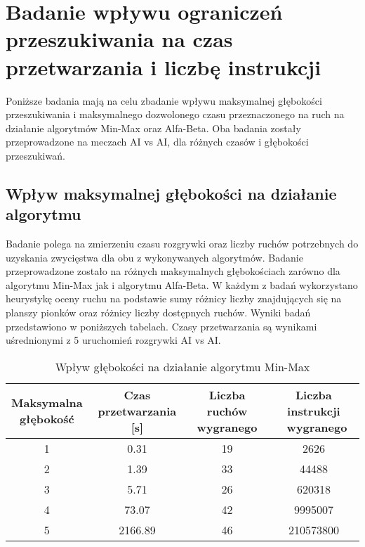 \documentclass[a4paper,10pt]{article}
\begin{document}
    \section{Badanie wpływu ograniczeń przeszukiwania na czas przetwarzania i liczbę instrukcji}
    Poniższe badania mają na celu zbadanie wpływu maksymalnej głębokości przeszukiwania i maksymalnego dozwolonego czasu przeznaczonego na ruch na działanie algorytmów Min-Max oraz Alfa-Beta. Oba badania zostały przeprowadzone na meczach AI vs AI, dla różnych czasów i głębokości przeszukiwań. 
    \justify
    \subsection{Wpływ maksymalnej głębokości na działanie algorytmu}
    Badanie polega na zmierzeniu czasu rozgrywki oraz liczby ruchów potrzebnych do uzyskania zwycięstwa dla obu z wykonywanych algorytmów. Badanie przeprowadzone zostało na różnych maksymalnych głębokościach zarówno dla algorytmu Min-Max jak i algorytmu Alfa-Beta. W każdym z badań wykorzystano heurystykę oceny ruchu na podstawie sumy różnicy liczby znajdujących się na planszy pionków oraz różnicy liczby dostępnych ruchów. Wyniki badań przedstawiono w poniższych tabelach. Czasy przetwarzania są wynikami uśrednionymi z 5 uruchomień rozgrywki AI vs AI.
    
    \begin{table}[H]
    \caption{Wpływ głębokości na działanie algorytmu Min-Max}
    \label{minmax_depth}
    \begin{center}
    \begin{tabular}{|c|c|c|c|} 
    \hline
    \thead{Maksymalna \\ głębokość} & \thead{Czas \\ przetwarzania [s]} & \thead{Liczba ruchów  \\ wygranego} & \thead{Liczba instrukcji \\\ wygranego} \\
    \hline
    {1} & \makecell{}0.31 & \makecell{}19 & \makecell{}2626 \\
    \hline
    {2} & \makecell{}1.39 & \makecell{}33 & \makecell{}44488 \\ 
    \hline
    {3} & \makecell{}5.71 & \makecell{}26 & \makecell{}620318 \\ 
    \hline
    {4} & \makecell{}73.07 & \makecell{}42 & \makecell{}9995007 \\ 
    \hline
    {5} & \makecell{}2166.89 & \makecell{}46 & \makecell{}210573800 \\ 
    \hline
    \end{tabular}
    \end{center}
     \end{table}
    
\end{document}
